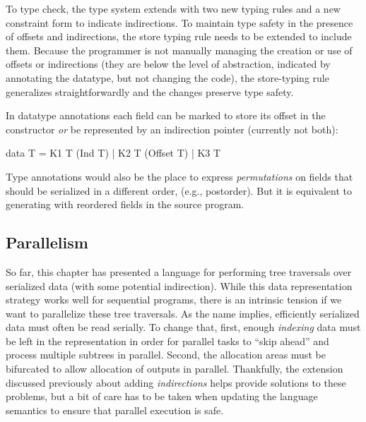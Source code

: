 To type check, the type system extends with two new typing rules and a
new constraint form to indicate indirections.
%
To maintain type safety in the presence of offsets and indirections,
the store typing rule needs to be extended to include them.
%
Because the programmer is not manually managing the creation or use of offsets
or indirections (they are below the level of abstraction, indicated by
annotating the datatype, but not changing the code), the store-typing rule
generalizes straightforwardly and the changes preserve type safety.

In datatype annotations each field can be marked to store its offset in the constructor {\em
  or} be represented by an indirection pointer (currently not both):
\begin{code}
data T = K1 T (Ind T) | K2 T (Offset T) | K3 T
\end{code}
Type annotations would also be the place to express {\em permutations} on fields
that should be serialized in a different order, (e.g., postorder).  But it is
equivalent to generating \ourcalc{} with reordered fields in the source program.

\subsection{Parallelism}\label{subsec:parallelism}

So far, this chapter has presented a language for performing tree traversals
over serialized data (with some potential indirection). While this data representation
strategy works well for sequential programs, there is an intrinsic tension if we
want to parallelize these tree traversals. As the name implies, efficiently
serialized data must often be read serially. To change that, first, enough
\emph{indexing} data must be left in the representation in order for parallel tasks to
``skip ahead'' and process multiple subtrees in parallel. Second, the allocation
areas must be bifurcated to allow allocation of outputs in parallel.
Thankfully, the extension discussed previously about adding \emph{indirections}
helps provide solutions to these problems, but a bit of care has to be taken
when updating the language semantics to ensure that parallel execution is safe.


